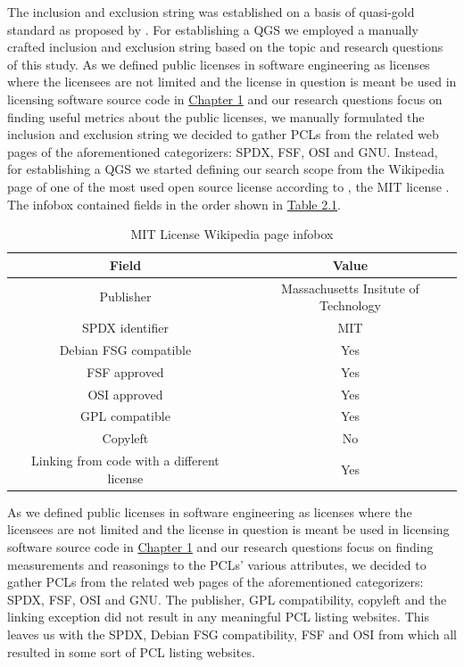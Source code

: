 The inclusion and exclusion string was established on a basis of quasi-gold standard as proposed by \cite{qgs}. For establishing a QGS we employed a manually crafted inclusion and exclusion string based on the topic and research questions of this study. As we defined public licenses in software engineering as licenses where the licensees are not limited and the license in question is meant be used in licensing software source code in \hyperref[intro]{Chapter 1} and our research questions focus on finding useful metrics about the public licenses, we manually formulated the inclusion and exclusion string %
we decided to gather PCLs from the related web pages of the aforementioned categorizers: SPDX, FSF, OSI and GNU.
Instead, for establishing a QGS we started defining our search scope from the Wikipedia page of one of the most used open source license according to \cite{github:licenseusage}, the MIT license \citep{wikipedia:mit}. The infobox contained fields in the order shown in \hyperref[table:infobox]{Table 2.1}.

\begin{table}[t]
	\begin{center}
		\begin{tabular}{||c c||}
			\hline
			Field & Value \\
			\hline
			Publisher & Massachusetts Insitute of Technology \\
			SPDX identifier & MIT \\
			Debian FSG compatible & Yes \\
			FSF approved & Yes \\
			OSI approved & 	Yes \\
			GPL compatible & Yes \\
			Copyleft & No \\
			Linking from code with a different license & Yes \\
			\hline
		\end{tabular}
		\caption{MIT License Wikipedia page infobox}
		\label{table:infobox}
	\end{center}
\end{table}

As we defined public licenses in software engineering as licenses where the licensees are not limited and the license in question is meant be used in licensing software source code in \hyperref[intro]{Chapter 1} and our research questions focus on finding measurements and reasonings to the PCLs' various attributes, we decided to gather PCLs from the related web pages of the aforementioned categorizers: SPDX, FSF, OSI and GNU. The publisher, GPL compatibility, copyleft and the linking exception did not result in any meaningful PCL listing websites. This leaves us with the SPDX, Debian FSG compatibility, FSF and OSI from which all resulted in some sort of PCL listing websites.

